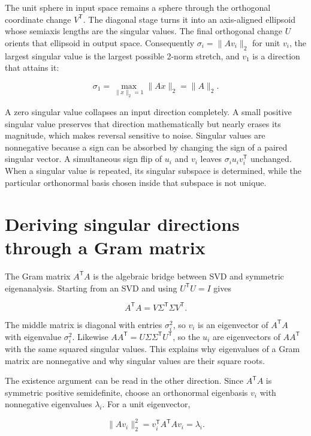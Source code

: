 The unit sphere in input space remains a sphere through the orthogonal coordinate change \(V^\mathsf T\). The diagonal stage turns it into an axis-aligned ellipsoid whose semiaxis lengths are the singular values. The final orthogonal change \(U\) orients that ellipsoid in output space. Consequently \(\sigma_i=\|Av_i\|_2\) for unit \(v_i\), the largest singular value is the largest possible 2-norm stretch, and \(v_1\) is a direction that attains it:

\[
\sigma_1=\max_{\|x\|_2=1}\|Ax\|_2=\|A\|_2.
\]

A zero singular value collapses an input direction completely. A small positive singular value preserves that direction mathematically but nearly erases its magnitude, which makes reversal sensitive to noise. Singular values are nonnegative because a sign can be absorbed by changing the sign of a paired singular vector. A simultaneous sign flip of \(u_i\) and \(v_i\) leaves \(\sigma_i u_i v_i^\mathsf T\) unchanged. When a singular value is repeated, its singular subspace is determined, while the particular orthonormal basis chosen inside that subspace is not unique.

\section{Deriving singular directions through a Gram matrix}\label{02-foundations-ii-ch024-deriving-singular-directions-through-a-gram-matrix}

The Gram matrix \(A^\mathsf T A\) is the algebraic bridge between SVD and symmetric eigenanalysis. Starting from an SVD and using \(U^\mathsf T U=I\) gives

\[
A^\mathsf T A=V\Sigma^\mathsf T\Sigma V^\mathsf T.
\]

The middle matrix is diagonal with entries \(\sigma_i^2\), so \(v_i\) is an eigenvector of \(A^\mathsf T A\) with eigenvalue \(\sigma_i^2\). Likewise \(AA^\mathsf T=U\Sigma\Sigma^\mathsf T U^\mathsf T\), so the \(u_i\) are eigenvectors of \(AA^\mathsf T\) with the same squared singular values. This explains why eigenvalues of a Gram matrix are nonnegative and why singular values are their square roots.

The existence argument can be read in the other direction. Since \(A^\mathsf T A\) is symmetric positive semidefinite, choose an orthonormal eigenbasis \(v_i\) with nonnegative eigenvalues \(\lambda_i\). For a unit eigenvector,

\[
\|Av_i\|_2^2=v_i^\mathsf T A^\mathsf T A v_i=\lambda_i.
\]

